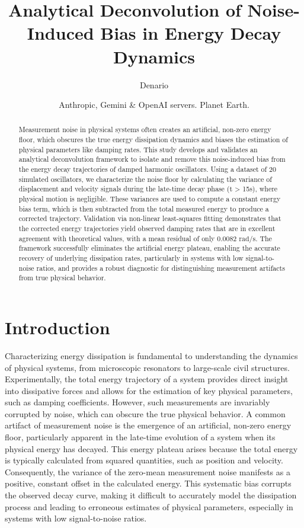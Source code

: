 \documentclass[]{article}
\begin{document}
\title{Analytical Deconvolution of Noise-Induced Bias in Energy Decay Dynamics}

\author{Denario}
\date{Anthropic, Gemini \& OpenAI servers. Planet Earth.}

\maketitle
\begin{abstract}
Measurement noise in physical systems often creates an artificial, non-zero energy floor, which obscures the true energy dissipation dynamics and biases the estimation of physical parameters like damping rates. This study develops and validates an analytical deconvolution framework to isolate and remove this noise-induced bias from the energy decay trajectories of damped harmonic oscillators. Using a dataset of 20 simulated oscillators, we characterize the noise floor by calculating the variance of displacement and velocity signals during the late-time decay phase (t > 15s), where physical motion is negligible. These variances are used to compute a constant energy bias term, which is then subtracted from the total measured energy to produce a corrected trajectory. Validation via non-linear least-squares fitting demonstrates that the corrected energy trajectories yield observed damping rates that are in excellent agreement with theoretical values, with a mean residual of only $0.0082 \text{ rad/s}$. The framework successfully eliminates the artificial energy plateau, enabling the accurate recovery of underlying dissipation rates, particularly in systems with low signal-to-noise ratios, and provides a robust diagnostic for distinguishing measurement artifacts from true physical behavior.
\end{abstract}








\section{Introduction}
\label{sec:intro}
Characterizing energy dissipation is fundamental to understanding the dynamics of physical systems, from microscopic resonators to large-scale civil structures. Experimentally, the total energy trajectory of a system provides direct insight into dissipative forces and allows for the estimation of key physical parameters, such as damping coefficients. However, such measurements are invariably corrupted by noise, which can obscure the true physical behavior. A common artifact of measurement noise is the emergence of an artificial, non-zero energy floor, particularly apparent in the late-time evolution of a system when its physical energy has decayed. This energy plateau arises because the total energy is typically calculated from squared quantities, such as position and velocity. Consequently, the variance of the zero-mean measurement noise manifests as a positive, constant offset in the calculated energy. This systematic bias corrupts the observed decay curve, making it difficult to accurately model the dissipation process and leading to erroneous estimates of physical parameters, especially in systems with low signal-to-noise ratios.
\end{document}

